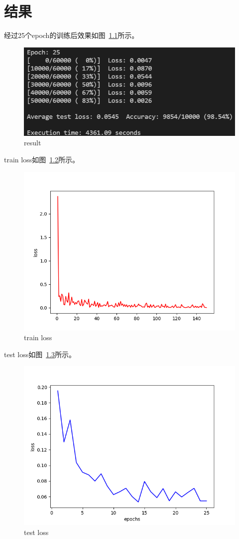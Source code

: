 \documentclass[UTF8]{ctexrep}
\begin{document}
\chapter{结果}
经过25个epoch的训练后效果如图~\ref{fig:result}所示。
\begin{figure}
    \centering
    \includegraphics[width=0.9\linewidth]{result.png}
    \caption{result}
    \label{fig:result}
\end{figure}

\graphicspath{{../}}
train loss如图~\ref{fig:train-loss}所示。
\begin{figure}
    \centering
    \includegraphics[width=0.9\linewidth]{train-loss.png}
    \caption{train loss}
    \label{fig:train-loss}
\end{figure}

test loss如图~\ref{fig:test-loss}所示。
\begin{figure}
    \centering
    \includegraphics[width=0.9\linewidth]{test-loss.png}
    \caption{test loss}
    \label{fig:test-loss}
\end{figure}



\end{document}
